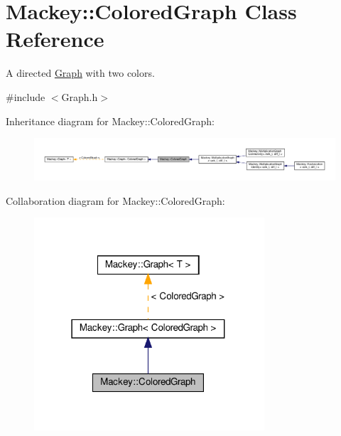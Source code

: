 \hypertarget{classMackey_1_1ColoredGraph}{}\section{Mackey\+:\+:Colored\+Graph Class Reference}
\label{classMackey_1_1ColoredGraph}


A directed \hyperlink{classMackey_1_1Graph}{Graph} with two colors.  




{\ttfamily \#include $<$Graph.\+h$>$}



Inheritance diagram for Mackey\+:\+:Colored\+Graph\+:\nopagebreak
\begin{figure}[H]
\begin{center}
\leavevmode
\includegraphics[width=350pt]{classMackey_1_1ColoredGraph__inherit__graph}
\end{center}
\end{figure}


Collaboration diagram for Mackey\+:\+:Colored\+Graph\+:\nopagebreak
\begin{figure}[H]
\begin{center}
\leavevmode
\includegraphics[width=243pt]{classMackey_1_1ColoredGraph__coll__graph}
\end{center}
\end{figure}
